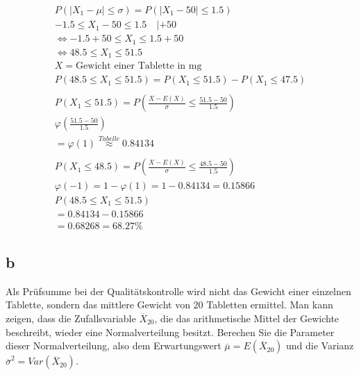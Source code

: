 \begin{align*}
    P\left(\left|X_1 - \mu\right| \leq \sigma\right) = P\left(\left|X_1 - 50\right| \leq 1.5\right) \\
    -1.5 \leq X_1 - 50 \leq 1.5 \quad | + 50                                                        \\
    \Leftrightarrow -1.5 + 50 \leq X_1 \leq 1.5 + 50                                                \\
    \Leftrightarrow 48.5 \leq X_1 \leq 51.5                                                         \\
    X = \text{Gewicht einer Tablette in mg}                                                         \\
    P\left(48.5 \leq X_1 \leq 51.5\right) = P(X_1 \leq 51.5) - P(X_1 \leq 47.5)                     \\\\
    P(X_1 \leq 51.5) = P\left(\frac{X - E(X)}{\sigma} \leq \frac{51.5 - 50}{1.5}\right)             \\
    \varphi\left(\frac{51.5 - 50}{1.5}\right)                                                       \\
    = \varphi(1) \overset{Tabelle}{\approx} 0.84134                                                 \\\\
    P(X_1 \leq 48.5) = P\left(\frac{X - E(X)}{\sigma} \leq \frac{48.5 - 50}{1.5}\right)             \\
    \varphi(-1) = 1 - \varphi(1) = 1 - 0.84134 = 0.15866                                            \\
    P(48.5 \leq X_1 \leq 51.5)                                                                      \\
    = 0.84134 - 0.15866                                                                             \\
    = 0.68268 = 68.27\%
\end{align*}

\subsection{b}

Als Prüfsumme bei der Qualitätskontrolle wird nicht das Gewicht einer einzelnen
Tablette, sondern das mittlere Gewicht von $20$ Tabletten ermittel. Man kann
zeigen, dass die Zufallsvariable $\overline{X}_{20}$, die das arithmetische
Mittel der Gewichte beschreibt, wieder eine Normalverteilung besitzt. Berechen
Sie die Parameter dieser Normalverteilung, also dem Erwartungswert
$\overline{\mu} = E(\overline{X}_{20})$ und die Varianz $\overline{\sigma}^2 =
    Var(\overline{X}_{20})$.

